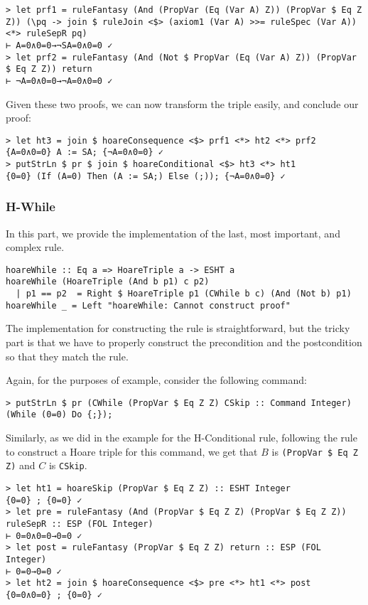 \documentclass{article}
\begin{document}
\begin{lstlisting}
> let prf1 = ruleFantasy (And (PropVar (Eq (Var A) Z)) (PropVar $ Eq Z Z)) (\pq -> join $ ruleJoin <$> (axiom1 (Var A) >>= ruleSpec (Var A)) <*> ruleSepR pq)
⊢ A=0∧0=0→¬SA=0∧0=0 ✓
> let prf2 = ruleFantasy (And (Not $ PropVar (Eq (Var A) Z)) (PropVar $ Eq Z Z)) return
⊢ ¬A=0∧0=0→¬A=0∧0=0 ✓
\end{lstlisting}

Given these two proofs, we can now transform the triple easily, and conclude our proof:

\begin{lstlisting}
> let ht3 = join $ hoareConsequence <$> prf1 <*> ht2 <*> prf2
{A=0∧0=0} A := SA; {¬A=0∧0=0} ✓
> putStrLn $ pr $ join $ hoareConditional <$> ht3 <*> ht1
{0=0} (If (A=0) Then (A := SA;) Else (;)); {¬A=0∧0=0} ✓
\end{lstlisting}

\subsubsection{H-While}

In this part, we provide the implementation of the last, most important, and complex rule.

\begin{lstlisting}
hoareWhile :: Eq a => HoareTriple a -> ESHT a
hoareWhile (HoareTriple (And b p1) c p2)
  | p1 == p2  = Right $ HoareTriple p1 (CWhile b c) (And (Not b) p1)
hoareWhile _ = Left "hoareWhile: Cannot construct proof"
\end{lstlisting}

The implementation for constructing the rule is straightforward, but the tricky part is that we have to properly construct the precondition and the postcondition so that they match the rule.

\pagebreak

Again, for the purposes of example, consider the following command:

\begin{lstlisting}
> putStrLn $ pr (CWhile (PropVar $ Eq Z Z) CSkip :: Command Integer)
(While (0=0) Do {;});
\end{lstlisting}

Similarly, as we did in the example for the H-Conditional rule, following the rule to construct a Hoare triple for this command, we get that $B$ is \texttt{(PropVar \$ Eq Z Z)} and $C$ is \texttt{CSkip}.

\begin{lstlisting}
> let ht1 = hoareSkip (PropVar $ Eq Z Z) :: ESHT Integer
{0=0} ; {0=0} ✓
> let pre = ruleFantasy (And (PropVar $ Eq Z Z) (PropVar $ Eq Z Z)) ruleSepR :: ESP (FOL Integer)
⊢ 0=0∧0=0→0=0 ✓
> let post = ruleFantasy (PropVar $ Eq Z Z) return :: ESP (FOL Integer)
⊢ 0=0→0=0 ✓
> let ht2 = join $ hoareConsequence <$> pre <*> ht1 <*> post
{0=0∧0=0} ; {0=0} ✓
\end{lstlisting}
\end{document}
